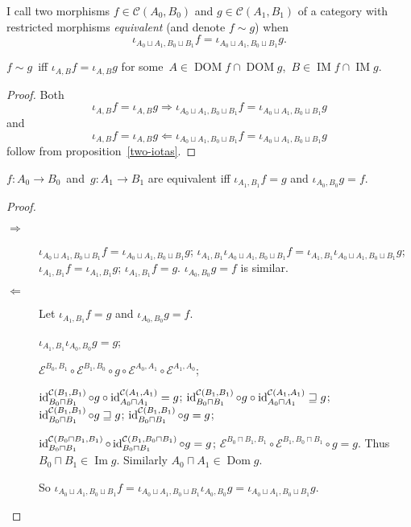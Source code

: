 \begin{defn}
I call two morphisms $f\in\mathcal{C}(A_0,B_0)$ and
$g\in\mathcal{C}(A_1,B_1)$
of a category with restricted morphisms \emph{equivalent}
(and denote $f\sim g$) when
\[\iota_{A_0\sqcup A_1,B_0\sqcup B_1}f=\iota_{A_0\sqcup A_1,B_0\sqcup B_1}g.\]
\end{defn}

\begin{prop}
$f\sim g$~iff $\iota_{A,B}f=\iota_{A,B}g$ for
some~$A\in\operatorname{DOM}f\cap\operatorname{DOM}g$,~$B\in\operatorname{IM}f\cap\operatorname{IM}g$.
\end{prop}

\begin{proof}
Both
\[\iota_{A,B}f=\iota_{A,B}g\Rightarrow
\iota_{A_0\sqcup A_1,B_0\sqcup B_1}f=\iota_{A_0\sqcup A_1,B_0\sqcup B_1}g\]
and
\[\iota_{A,B}f=\iota_{A,B}g\Leftarrow
\iota_{A_0\sqcup A_1,B_0\sqcup B_1}f=\iota_{A_0\sqcup A_1,B_0\sqcup B_1}g\]
follow from proposition~\ref{two-iotas}.
\end{proof}

\begin{thm}
$f:A_0\to B_0$~and~$g:A_1\to B_1$ are equivalent iff
$\iota_{A_1,B_1}f=g$ and $\iota_{A_0,B_0}g=f$.
\end{thm}

\begin{proof}
~
\begin{description}
\item[$\Rightarrow$]
$\iota_{A_0\sqcup A_1,B_0\sqcup B_1}f=\iota_{A_0\sqcup A_1,B_0\sqcup B_1}g$;
$\iota_{A_1,B_1}\iota_{A_0\sqcup A_1,B_0\sqcup B_1}f=\iota_{A_1,B_1}\iota_{A_0\sqcup A_1,B_0\sqcup B_1}g$;
$\iota_{A_1,B_1}f=\iota_{A_1,B_1}g$;
$\iota_{A_1,B_1}f=g$. $\iota_{A_0,B_0}g=f$ is similar.

\item[$\Leftarrow$] Let $\iota_{A_1, B_1} f = g$ and $\iota_{A_0, B_0} g = f$.

$\iota_{A_1, B_1} \iota_{A_0, B_0} g = g$;

$\mathcal{E}^{B_0, B_1} \circ \mathcal{E}^{B_1, B_0} \circ g \circ
\mathcal{E}^{A_0, A_1} \circ \mathcal{E}^{A_1, A_0}$;

$\operatorname{id}^{\mathcal{C} (B_1, B_1)}_{B_0 \sqcap B_1} \circ g \circ
\operatorname{id}^{\mathcal{C} (A_1, A_1)}_{A_0 \sqcap A_1} = g$;
$\operatorname{id}^{\mathcal{C} (B_1, B_1)}_{B_0 \sqcap B_1} \circ g \circ
\operatorname{id}^{\mathcal{C} (A_1, A_1)}_{A_0 \sqcap A_1} \sqsupseteq g$;
$\operatorname{id}^{\mathcal{C} (B_1, B_1)}_{B_0 \sqcap B_1} \circ g \sqsupseteq g$;
$\operatorname{id}^{\mathcal{C} (B_1, B_1)}_{B_0 \sqcap B_1} \circ g = g$;

$\operatorname{id}^{\mathcal{C} (B_0 \sqcap B_1, B_1)}_{B_0 \sqcap B_1} \circ
\operatorname{id}^{\mathcal{C} (B_1, B_0 \sqcap B_1)}_{B_0 \sqcap B_1} \circ g = g$;
$\mathcal{E}^{B_0 \sqcap B_1, B_1} \circ \mathcal{E}^{B_1, B_0 \sqcap B_1}
\circ g = g$. Thus $B_0 \sqcap B_1 \in \operatorname{Im} g$. Similarly $A_0 \sqcap A_1
\in \operatorname{Dom} g$.

So $\iota_{A_0 \sqcup A_1, B_0 \sqcup B_1} f = \iota_{A_0 \sqcup A_1, B_0
\sqcup B_1} \iota_{A_0, B_0} g = \iota_{A_0 \sqcup A_1, B_0 \sqcup B_1} g$.
\end{description}
\end{proof}

